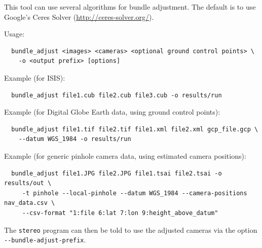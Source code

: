 This tool can use several algorithms for bundle adjustment. The default is
to use Google's Ceres Solver (\url{http://ceres-solver.org/}).

Usage:
\begin{verbatim}
  bundle_adjust <images> <cameras> <optional ground control points> \
    -o <output prefix> [options]
\end{verbatim}

Example (for ISIS):
\begin{verbatim}
  bundle_adjust file1.cub file2.cub file3.cub -o results/run
\end{verbatim}

Example (for Digital Globe Earth data, using ground control points):
\begin{verbatim}
  bundle_adjust file1.tif file2.tif file1.xml file2.xml gcp_file.gcp \
    --datum WGS_1984 -o results/run
\end{verbatim}

Example (for generic pinhole camera data, using estimated camera positions):
\begin{verbatim}
  bundle_adjust file1.JPG file2.JPG file1.tsai file2.tsai -o results/out \
     -t pinhole --local-pinhole --datum WGS_1984 --camera-positions nav_data.csv \
     --csv-format "1:file 6:lat 7:lon 9:height_above_datum"
\end{verbatim}

The \texttt{stereo} program can then be told to use the adjusted cameras
via the option \texttt{-\/-bundle-adjust-prefix}.

